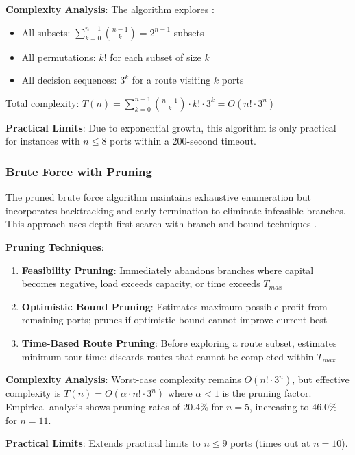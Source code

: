 \documentclass[12pt]{article}
\begin{document}
\textbf{Complexity Analysis}: The algorithm explores \cite{cormen2009}:
\begin{itemize}
    \item All subsets: $\sum_{k=0}^{n-1} \binom{n-1}{k} = 2^{n-1}$ subsets
    \item All permutations: $k!$ for each subset of size $k$ \cite{knuth2011}
    \item All decision sequences: $3^k$ for a route visiting $k$ ports
\end{itemize}

Total complexity: $T(n) = \sum_{k=0}^{n-1} \binom{n-1}{k} \cdot k! \cdot 3^k = O(n! \cdot 3^n)$

\textbf{Practical Limits}: Due to exponential growth, this algorithm is only practical for instances with $n \leq 8$ ports within a 200-second timeout.

\subsubsection{Brute Force with Pruning}

The pruned brute force algorithm maintains exhaustive enumeration but incorporates backtracking and early termination to eliminate infeasible branches. This approach uses depth-first search with branch-and-bound techniques \cite{horowitz1978,lawler1966}.

\textbf{Pruning Techniques}:
\begin{enumerate}
    \item \textbf{Feasibility Pruning}: Immediately abandons branches where capital becomes negative, load exceeds capacity, or time exceeds $T_{max}$
    \item \textbf{Optimistic Bound Pruning}: Estimates maximum possible profit from remaining ports; prunes if optimistic bound cannot improve current best
    \item \textbf{Time-Based Route Pruning}: Before exploring a route subset, estimates minimum tour time; discards routes that cannot be completed within $T_{max}$
\end{enumerate}

\textbf{Complexity Analysis}: Worst-case complexity remains $O(n! \cdot 3^n)$, but effective complexity is $T(n) = O(\alpha \cdot n! \cdot 3^n)$ where $\alpha < 1$ is the pruning factor. Empirical analysis shows pruning rates of 20.4\% for $n=5$, increasing to 46.0\% for $n=11$.

\textbf{Practical Limits}: Extends practical limits to $n \leq 9$ ports (times out at $n=10$).
\end{document}
